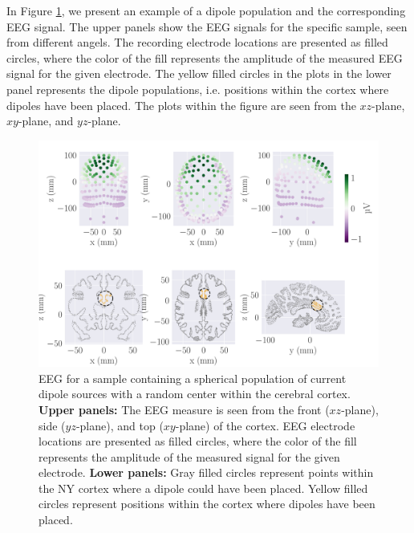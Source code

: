 \documentclass[a4paper, UKenglish, 11pt]{uiomaster}
\begin{document}
In Figure \ref{fig:dipole_area}, we present an example of a dipole population and the corresponding EEG signal. The upper panels show the EEG signals for the specific sample, seen from different angels. The recording electrode locations are presented as filled circles, where the color of the fill represents the amplitude of the measured EEG signal for the given electrode. The yellow filled circles in the plots in the lower panel represents the dipole populations, i.e. positions within the cortex where dipoles have been placed. The plots within the figure are seen from the $xz$-plane, $xy$-plane, and $yz$-plane.

\begin{figure}[!htb]
\centering
\includegraphics[width=\linewidth]{figures/purple_green/dipole_area_reduced_0.pdf}
\caption{EEG for a sample containing a spherical population of current dipole sources with a random center within the cerebral cortex.
\textbf{Upper panels:}
The EEG measure is seen from the front ($xz$-plane), side ($yz$-plane), and top ($xy$-plane) of the cortex. EEG electrode locations are presented as filled circles, where the color of the fill represents the amplitude of the measured signal for the given electrode.
\textbf{Lower panels:}
Gray filled circles represent points within the NY cortex where a dipole could have been placed. Yellow filled circles represent positions within the cortex where dipoles have been placed.}
\label{fig:dipole_area}
\end{figure}

\end{document}
